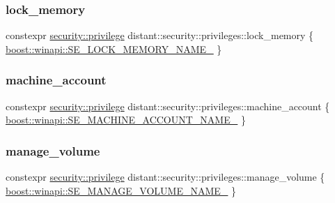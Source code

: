 \mbox{\label{namespacedistant_1_1security_1_1privileges_aa4239f48349b7aa8cd4f266248687e2f}} 
\subsubsection{\texorpdfstring{lock\+\_\+memory}{lock\_memory}}
{\footnotesize\ttfamily constexpr \mbox{\hyperlink{classdistant_1_1security_1_1privilege}{security\+::privilege}} distant\+::security\+::privileges\+::lock\+\_\+memory \{ \mbox{\hyperlink{namespaceboost_1_1winapi_a6ad5ab72230b251b2b046322e78789cb}{boost\+::winapi\+::\+S\+E\+\_\+\+L\+O\+C\+K\+\_\+\+M\+E\+M\+O\+R\+Y\+\_\+\+N\+A\+M\+E\+\_\+}} \}}

\mbox{\label{namespacedistant_1_1security_1_1privileges_aa656368ca1a337a457f4ea433ad40324}} 
\subsubsection{\texorpdfstring{machine\+\_\+account}{machine\_account}}
{\footnotesize\ttfamily constexpr \mbox{\hyperlink{classdistant_1_1security_1_1privilege}{security\+::privilege}} distant\+::security\+::privileges\+::machine\+\_\+account \{ \mbox{\hyperlink{namespaceboost_1_1winapi_a2b8e25b827283fdd46322e4798f66794}{boost\+::winapi\+::\+S\+E\+\_\+\+M\+A\+C\+H\+I\+N\+E\+\_\+\+A\+C\+C\+O\+U\+N\+T\+\_\+\+N\+A\+M\+E\+\_\+}} \}}

\mbox{\label{namespacedistant_1_1security_1_1privileges_ad14bfbef73e500187405f41852199ea6}} 
\subsubsection{\texorpdfstring{manage\+\_\+volume}{manage\_volume}}
{\footnotesize\ttfamily constexpr \mbox{\hyperlink{classdistant_1_1security_1_1privilege}{security\+::privilege}} distant\+::security\+::privileges\+::manage\+\_\+volume \{ \mbox{\hyperlink{namespaceboost_1_1winapi_a373ba0c67213053cc59e416ce2b88b3c}{boost\+::winapi\+::\+S\+E\+\_\+\+M\+A\+N\+A\+G\+E\+\_\+\+V\+O\+L\+U\+M\+E\+\_\+\+N\+A\+M\+E\+\_\+}} \}}

